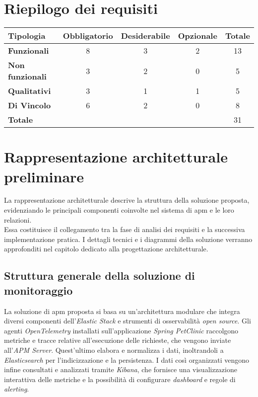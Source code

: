 \newpage
\section{Riepilogo dei requisiti}

\begin{center}
\label{tab:requisiti-riepilogo}
\begin{tabular}{|l|c|c|c|c|}
\hline
\rowcolor[gray]{0.8}
\textbf{Tipologia} & \textbf{Obbligatorio} & \textbf{Desiderabile} & \textbf{Opzionale} & \textbf{Totale} \\
\hline
\textbf{Funzionali} & 8 & 3 & 2 & 13 \\
\hline

\hline
\textbf{Non funzionali} & 3 & 2 & 0 & 5 \\
\hline

\hline
\textbf{Qualitativi} & 3 & 1 & 1 & 5 \\
\hline

\hline
\textbf{Di Vincolo} & 6 & 2 & 0 & 8 \\
\hline

\hline
\textbf{Totale} &  &  &  & 31 \\
\hline

\end{tabular}
\end{center}

\newpage
\section{Rappresentazione architetturale preliminare}
La rappresentazione architetturale descrive la struttura della soluzione proposta, evidenziando le principali componenti coinvolte nel sistema di \gls{apm} e le loro relazioni. \\
Essa costituisce il collegamento tra la fase di analisi dei requisiti e la successiva implementazione pratica. I dettagli tecnici e i diagrammi della soluzione verranno approfonditi nel capitolo dedicato alla progettazione architetturale.


\subsection{Struttura generale della soluzione di monitoraggio}
La soluzione di \gls{apm} proposta si basa su un'architettura modulare che integra diversi componenti dell'\emph{Elastic Stack} e strumenti di osservabilità \emph{open source}.
Gli agenti \textit{OpenTelemetry} installati sull'applicazione \textit{Spring PetClinic} raccolgono metriche e tracce relative all'esecuzione delle richieste, che vengono inviate all'\textit{APM Server}.
Quest'ultimo elabora e normalizza i dati, inoltrandoli a \textit{Elasticsearch} per l'indicizzazione e la persistenza.
I dati così organizzati vengono infine consultati e analizzati tramite \textit{Kibana}, che fornisce una visualizzazione interattiva delle metriche e la possibilità di configurare \emph{dashboard} e regole di \emph{alerting}.


